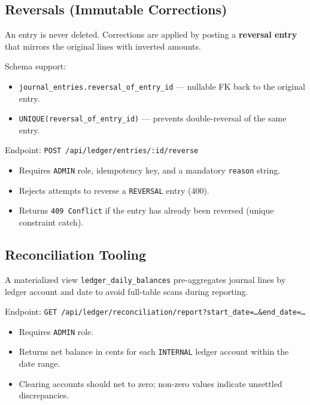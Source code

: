 \subsection{Reversals (Immutable Corrections)}
An entry is never deleted. Corrections are applied by posting a \textbf{reversal entry} that mirrors the original lines with inverted amounts.

Schema support:
\begin{itemize}[nosep]
  \item \texttt{journal\_entries.reversal\_of\_entry\_id} --- nullable FK back to the original entry.
  \item \texttt{UNIQUE(reversal\_of\_entry\_id)} --- prevents double-reversal of the same entry.
\end{itemize}

Endpoint: \texttt{POST /api/ledger/entries/:id/reverse}
\begin{itemize}[nosep]
  \item Requires \texttt{ADMIN} role, idempotency key, and a mandatory \texttt{reason} string.
  \item Rejects attempts to reverse a \texttt{REVERSAL} entry (400).
  \item Returns \texttt{409 Conflict} if the entry has already been reversed (unique constraint catch).
\end{itemize}

\subsection{Reconciliation Tooling}
A materialized view \texttt{ledger\_daily\_balances} pre-aggregates journal lines by ledger account and date to avoid full-table scans during reporting.

Endpoint: \texttt{GET /api/ledger/reconciliation/report?start\_date=\dots\&end\_date=\dots}
\begin{itemize}[nosep]
  \item Requires \texttt{ADMIN} role.
  \item Returns net balance in cents for each \texttt{INTERNAL} ledger account within the date range.
  \item Clearing accounts should net to zero; non-zero values indicate unsettled discrepancies.
\end{itemize}

